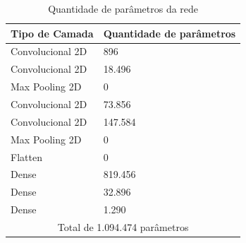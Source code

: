 \begin{table}[H]
    \centering
    \begin{tabular}{ |p{4cm}|p{3cm}|  }
 \hline
 Tipo de Camada&Quantidade de parâmetros \\
 \hline
    Convolucional 2D        &896    \\
    Convolucional 2D        &18.496    \\
    Max Pooling 2D          &0    \\
    Convolucional 2D        &73.856    \\
    Convolucional 2D        &147.584    \\
    Max Pooling 2D          &0    \\
    Flatten                 &0    \\
    Dense                   &819.456    \\
    Dense                   &32.896    \\
    Dense                   &1.290    \\
    
 \hline
 \multicolumn{2}{|c|}{Total de 1.094.474 parâmetros} \\
 \hline
\end{tabular}
    \caption{Quantidade de parâmetros da rede}
    \label{tab:my_label}
\end{table}
















